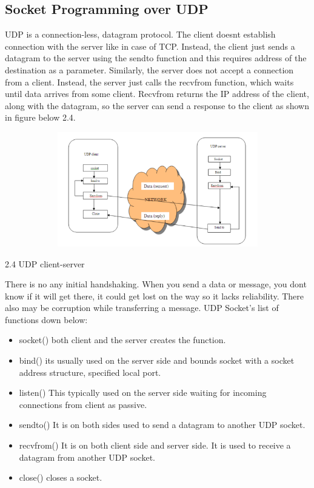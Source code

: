 \documentclass[12pt]{extarticle}
\begin{document}
\subsection{Socket Programming over UDP}

UDP is a connection-less, datagram protocol. The client doesnt establish connection with the server like in case of TCP.
Instead, the client just sends a datagram to the server using the sendto function and this requires
address of the destination as a parameter. Similarly, the server does not accept a connection from a client.
Instead, the server just calls the recvfrom function, which waits until data arrives from some client.
Recvfrom returns the IP address of the client, along with the datagram, so the server can send a response to the client
as shown in figure below 2.4.

\begin{center}

    \includegraphics[width=15cm, height=5cm]{UDP client-server}
    
        2.4 UDP client-server
    
\end{center}

There is no any initial handshaking. When you send a data or message, you dont know if it will
get there, it could get lost on the way so it lacks reliability. There also may be corruption
while transferring a message.
UDP Socket's list of functions down below:

\begin{itemize}
    \item socket() both client and the server creates the function.
    \item bind() its usually used on the server side and bounds socket with a socket address structure, specified local port.
    \item listen() This typically used on the server side waiting for incoming connections from client as passive.
    \item sendto() It is on both sides used to send a datagram to another UDP socket.
    \item recvfrom() It is on both client side and server side. It is used to receive a datagram from another UDP socket.
    \item close() closes a socket.
\end{itemize}
\end{document}
